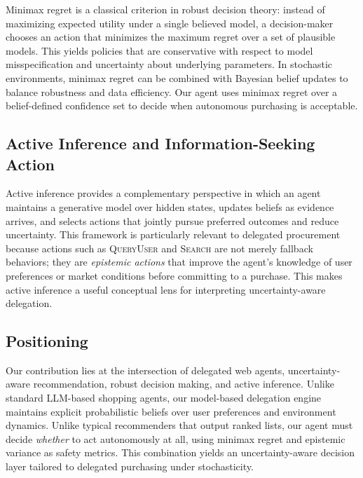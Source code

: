 \documentclass[11pt]{article}
\begin{document}
Minimax regret is a classical criterion in robust decision theory: instead of maximizing expected utility under a single believed model, a decision-maker chooses an action that minimizes the maximum regret over a set of plausible models.\cite{regretDecision1982} This yields policies that are conservative with respect to model misspecification and uncertainty about underlying parameters. In stochastic environments, minimax regret can be combined with Bayesian belief updates to balance robustness and data efficiency.\cite{rigter2020minimax} Our agent uses minimax regret over a belief-defined confidence set to decide when autonomous purchasing is acceptable.

\subsection{Active Inference and Information-Seeking Action}

Active inference provides a complementary perspective in which an agent maintains a generative model over hidden states, updates beliefs as evidence arrives, and selects actions that jointly pursue preferred outcomes and reduce uncertainty.\cite{bogacz2017tutorial,smith2022active} This framework is particularly relevant to delegated procurement because actions such as \textsc{QueryUser} and \textsc{Search} are not merely fallback behaviors; they are \emph{epistemic actions} that improve the agent's knowledge of user preferences or market conditions before committing to a purchase. This makes active inference a useful conceptual lens for interpreting uncertainty-aware delegation.

\subsection{Positioning}

Our contribution lies at the intersection of delegated web agents, uncertainty-aware recommendation, robust decision making, and active inference.\cite{yao2022webshop,bdecf2025,rigter2020minimax,bogacz2017tutorial} Unlike standard LLM-based shopping agents, our model-based delegation engine maintains explicit probabilistic beliefs over user preferences and environment dynamics. Unlike typical recommenders that output ranked lists, our agent must decide \emph{whether} to act autonomously at all, using minimax regret and epistemic variance as safety metrics. This combination yields an uncertainty-aware decision layer tailored to delegated purchasing under stochasticity.
\end{document}
